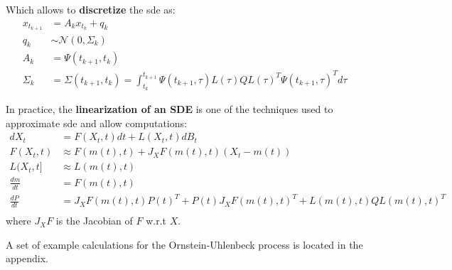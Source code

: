 Which allows to \textbf{discretize} the \gls{sde} as:
\begin{align}
    \label{linear sde discretization}
    x_{t_{k+1}} &= A_k x_{t_k} + q_k \\
    q_k &\sim \mathcal{N}(0, \Sigma_k) \\
    A_k &= \Psi(t_{k+1}, t_k) \\
    \Sigma_k &= \Sigma(t_{k+1}, t_k) = \int_{t_k}^{t_{k+1}} \Psi(t_{k+1}, \tau) L(\tau)Q L(\tau)^{T} \Psi(t_{k+1}, \tau)^{T} d\tau
\end{align}

In practice, the \textbf{linearization of an SDE} is one of the techniques used to approximate \gls{sde} and 
allow computations:
\begin{align}
    dX_t &= F(X_t, t)dt + L(X_t, t)dB_t \\
    F(X_t, t) &\approx F(m(t), t) + J_X F(m(t),t)(X_t - m(t)) \\
    L(X_t, t] &\approx L(m(t),t) \\
    \frac{dm}{dt} &= F(m(t), t) \\
    \frac{dP}{dt} &= J_X F(m(t),t) P(t)^{T} + P(t)J_X F(m(t),t)^{T} + L(m(t), t)QL(m(t),t)^{T} \\
\end{align}
where $J_X F$ is the Jacobian of $F$ w.r.t $X$.

A set of example calculations for the Ornstein-Uhlenbeck process is located in the appendix.